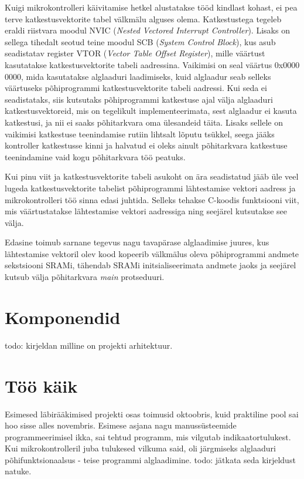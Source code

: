 \documentclass[12pt,a4paper]{article}
\begin{document}
Kuigi mikrokontrolleri käivitamise hetkel alustatakse tööd kindlast kohast, ei
pea terve katkestusvektorite tabel välkmälu alguses olema. Katkestustega tegeleb
eraldi riistvara moodul NVIC (\textit{Nested Vectored Interrupt Controller}).
Lisaks on sellega tihedalt seotud teine moodul SCB (\textit{System Control
Block}), kus asub seadistatav register VTOR (\textit{Vector Table Offset
Register}), mille väärtust kasutatakse katkestusvektorite tabeli aadressina.
\cite[ptk~4.4]{CM3pm} Vaikimisi on seal väärtus 0x0000 0000, mida kasutatakse alglaaduri
laadimiseks, kuid alglaadur seab selleks väärtuseks põhiprogrammi
katkestusvektorite tabeli aadressi. Kui seda ei seadistataks, siis kutsutaks
põhiprogrammi katkestuse ajal välja alglaaduri katkestusvektoreid, mis on
tegelikult implementeerimata, sest alglaadur ei kasuta katkestusi, ja nii ei
saaks põhitarkvara oma ülesandeid täita. Lisaks sellele on vaikimisi katkestuse
teenindamise rutiin lihtsalt lõputu tsükkel, seega jääks kontroller katkestusse
kinni ja halvatud ei oleks ainult põhitarkvara katkestuse teenindamine vaid kogu
põhitarkvara töö peatuks.

Kui pinu viit ja katkestusvektorite tabeli asukoht on ära seadistatud jääb üle
veel lugeda katkestusvektorite tabelist põhiprogrammi lähtestamise vektori
aadress ja mikrokontrolleri töö sinna edasi juhtida. Selleks tehakse C-koodis
funktsiooni viit, mis väärtustatakse lähtestamise vektori aadressiga ning
seejärel kutsutakse see välja.

Edasine toimub sarnane tegevus nagu tavapärase alglaadimise juures, kus
lähtestamise vektoril olev kood kopeerib välkmälus oleva põhiprogrammi andmete
sekstsiooni SRAMi, tähendab SRAMi initsialiseerimata andmete jaoks ja seejärel
kutsub välja põhitarkvara \textit{main} protseduuri.


\section{Komponendid}
todo: kirjeldan milline on projekti arhitektuur.

\section{Töö käik}
Esimesed läbirääkimised projekti osas toimusid oktoobris, kuid praktiline pool
sai hoo sisse alles novembris. Esimese asjana nagu manussüsteemide
programmeerimisel ikka, sai tehtud programm, mis vilgutab indikaatortulukest.
Kui mikrokontrolleril juba tulukesed vilkuma said, oli järgmiseks alglaaduri
põhifunktsionaalsus - teise programmi alglaadimine. todo: jätkata seda kirjeldust
natuke.
\end{document}

